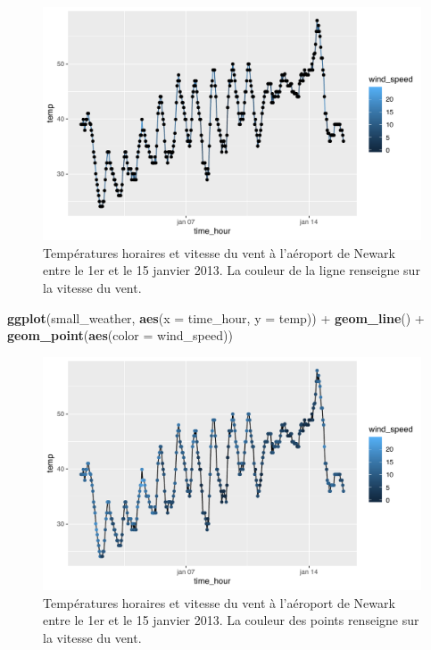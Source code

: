\documentclass[a4paperpaper,]{article}
\newenvironment{Shaded}{\begin{snugshade}}{\end{snugshade}}
\newcommand{\DataTypeTok}[1]{\textcolor[rgb]{0.00,0.34,0.68}{#1}}
\newcommand{\KeywordTok}[1]{\textcolor[rgb]{0.12,0.11,0.11}{\textbf{#1}}}
\newcommand{\NormalTok}[1]{\textcolor[rgb]{0.12,0.11,0.11}{#1}}
\newcommand{\OperatorTok}[1]{\textcolor[rgb]{0.12,0.11,0.11}{#1}}
\newcommand{\StringTok}[1]{\textcolor[rgb]{0.75,0.01,0.01}{#1}}
\begin{document}
\begin{figure}[htpb]

{\centering \includegraphics[width=0.9\linewidth]{figure/wind2-1} 

}

\caption{Températures horaires et vitesse du vent à l'aéroport de Newark entre le 1er et le 15 janvier 2013. La couleur de la ligne renseigne sur la vitesse du vent.}\label{fig:wind2}
\end{figure}

\begin{Shaded}
\begin{Highlighting}[]
\KeywordTok{ggplot}\NormalTok{(small_weather, }\KeywordTok{aes}\NormalTok{(}\DataTypeTok{x =}\NormalTok{ time_hour, }\DataTypeTok{y =}\NormalTok{ temp)) }\OperatorTok{+}
\StringTok{  }\KeywordTok{geom_line}\NormalTok{() }\OperatorTok{+}
\StringTok{  }\KeywordTok{geom_point}\NormalTok{(}\KeywordTok{aes}\NormalTok{(}\DataTypeTok{color =}\NormalTok{ wind_speed))}
\end{Highlighting}
\end{Shaded}

\begin{figure}[htpb]

{\centering \includegraphics[width=0.9\linewidth]{figure/wind3-1} 

}

\caption{Températures horaires et vitesse du vent à l'aéroport de Newark entre le 1er et le 15 janvier 2013. La couleur des points renseigne sur la vitesse du vent.}\label{fig:wind3}
\end{figure}
\end{document}
